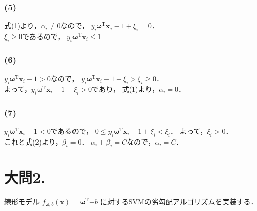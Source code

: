 \documentclass[fleqn]{jsarticle}
\begin{document}
\subsubsection*{(5)}
式(1)より，$\alpha_i \neq 0$なので，
$y_i {\mathbf \omega}^{\mathrm T} {\mathbf x}_i - 1 + \xi_i = 0$．\\
$\xi_i \geq 0$であるので，
$y_i {\mathbf \omega}^{\mathrm T} {\mathbf x}_i \leq 1$

\subsubsection*{(6)}
$y_i {\mathbf \omega}^{\mathrm T} {\mathbf x}_i - 1 > 0$なので，
$y_i {\mathbf \omega}^{\mathrm T} {\mathbf x}_i - 1 + \xi_i > \xi_i \geq 0$．\\
よって，$y_i {\mathbf \omega}^{\mathrm T} {\mathbf x}_i - 1 + \xi_i > 0$であり，
式(1)より，$\alpha_i = 0$．

\subsubsection*{(7)}
$y_i {\mathbf \omega}^{\mathrm T} {\mathbf x}_i - 1 <  0$であるので，
$0 \leq y_i {\mathbf \omega}^{\mathrm T} {\mathbf x}_i - 1 + \xi_i < \xi_i$．
よって，$\xi_i > 0$．\\
これと式(2)より，$\beta_i = 0$．
$\alpha_i + \beta_i = C$なので，$\alpha_i = C$．


\newpage

\section*{大問2.}
線形モデル
$f_{{\mathbf \omega}, b}(\mathbf x) = {\mathbf \omega}^{\mathrm T} {\mathbf + b}$
に対するSVMの劣勾配アルゴリズムを実装する．
\end{document}
